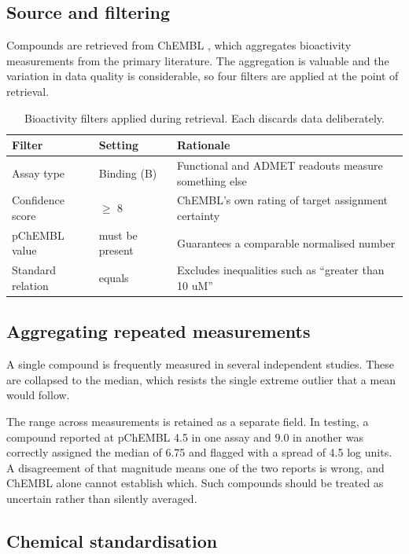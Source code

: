 \documentclass[11pt,a4paper]{article}
\begin{document}
\subsection{Source and filtering}

Compounds are retrieved from ChEMBL \cite{zdrazil2024}, which aggregates
bioactivity measurements from the primary literature. The aggregation is
valuable and the variation in data quality is considerable, so four filters are
applied at the point of retrieval.

\begin{table}[htbp]
\centering
\small
\caption{Bioactivity filters applied during retrieval. Each discards data
deliberately.}
\begin{tabular}{lll}
\toprule
\textbf{Filter} & \textbf{Setting} & \textbf{Rationale} \\
\midrule
Assay type & Binding (B) & Functional and ADMET readouts measure something else \\
Confidence score & $\geq$ 8 & ChEMBL's own rating of target assignment certainty \\
pChEMBL value & must be present & Guarantees a comparable normalised number \\
Standard relation & equals & Excludes inequalities such as ``greater than 10 uM'' \\
\bottomrule
\end{tabular}
\end{table}

\subsection{Aggregating repeated measurements}

A single compound is frequently measured in several independent studies. These
are collapsed to the median, which resists the single extreme outlier that a
mean would follow.

The range across measurements is retained as a separate field. In testing, a
compound reported at pChEMBL 4.5 in one assay and 9.0 in another was correctly
assigned the median of 6.75 and flagged with a spread of 4.5 log units. A
disagreement of that magnitude means one of the two reports is wrong, and
ChEMBL alone cannot establish which. Such compounds should be treated as
uncertain rather than silently averaged.

\subsection{Chemical standardisation}
\end{document}
